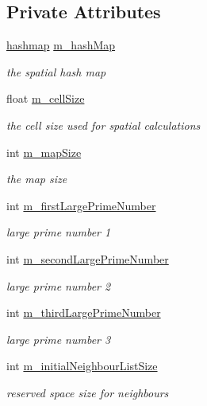 \subsection*{Private Attributes}
\begin{DoxyCompactItemize}
\item 
\hyperlink{_spatial_hashing_8h_a1b38b0ad37d6e1390643e8d735273c7f}{hashmap} \hyperlink{class_spatial_hashing_aa4c4c1eaf23e54dd42cc982a4e53ceaf}{m\_\-hashMap}
\begin{DoxyCompactList}\small\item\em the spatial hash map \item\end{DoxyCompactList}\item 
float \hyperlink{class_spatial_hashing_aed10321da282b758d14dd3112749197c}{m\_\-cellSize}
\begin{DoxyCompactList}\small\item\em the cell size used for spatial calculations \item\end{DoxyCompactList}\item 
int \hyperlink{class_spatial_hashing_a3062fc7637f6ba8aca2d4b74a3f96b9b}{m\_\-mapSize}
\begin{DoxyCompactList}\small\item\em the map size \item\end{DoxyCompactList}\item 
int \hyperlink{class_spatial_hashing_a99c2a49c03963d35b4961c51642582b3}{m\_\-firstLargePrimeNumber}
\begin{DoxyCompactList}\small\item\em large prime number 1 \item\end{DoxyCompactList}\item 
int \hyperlink{class_spatial_hashing_a80745b4791c3f19b1c2170c18b0832ac}{m\_\-secondLargePrimeNumber}
\begin{DoxyCompactList}\small\item\em large prime number 2 \item\end{DoxyCompactList}\item 
int \hyperlink{class_spatial_hashing_a705bb42422d5edd7d8605f95618760c1}{m\_\-thirdLargePrimeNumber}
\begin{DoxyCompactList}\small\item\em large prime number 3 \item\end{DoxyCompactList}\item 
int \hyperlink{class_spatial_hashing_a553569ddd4a57714697c57b70e850d9d}{m\_\-initialNeighbourListSize}
\begin{DoxyCompactList}\small\item\em reserved space size for neighbours \item\end{DoxyCompactList}\end{DoxyCompactItemize}


